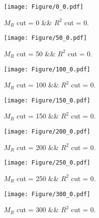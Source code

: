 \begin{figure}[H] 
\begin{center} 
\texttt{[image: Figure/0\_0.pdf]} 
\caption{$M_R$ cut = 0 \&\& $R^2$ cut = 0.} 
\label{Fig:0_0} 
\end{center} 
\end{figure} 
 
 
\begin{figure}[H] 
\begin{center} 
\texttt{[image: Figure/50\_0.pdf]} 
\caption{$M_R$ cut = 50 \&\& $R^2$ cut = 0.} 
\label{Fig:50_0} 
\end{center} 
\end{figure} 
 
 
\begin{figure}[H] 
\begin{center} 
\texttt{[image: Figure/100\_0.pdf]} 
\caption{$M_R$ cut = 100 \&\& $R^2$ cut = 0.} 
\label{Fig:100_0} 
\end{center} 
\end{figure} 
 
 
\begin{figure}[H] 
\begin{center} 
\texttt{[image: Figure/150\_0.pdf]} 
\caption{$M_R$ cut = 150 \&\& $R^2$ cut = 0.} 
\label{Fig:150_0} 
\end{center} 
\end{figure} 
 
 
\begin{figure}[H] 
\begin{center} 
\texttt{[image: Figure/200\_0.pdf]} 
\caption{$M_R$ cut = 200 \&\& $R^2$ cut = 0.} 
\label{Fig:200_0} 
\end{center} 
\end{figure} 
 
 
\begin{figure}[H] 
\begin{center} 
\texttt{[image: Figure/250\_0.pdf]} 
\caption{$M_R$ cut = 250 \&\& $R^2$ cut = 0.} 
\label{Fig:250_0} 
\end{center} 
\end{figure} 
 
 
\begin{figure}[H] 
\begin{center} 
\texttt{[image: Figure/300\_0.pdf]} 
\caption{$M_R$ cut = 300 \&\& $R^2$ cut = 0.} 
\label{Fig:300_0} 
\end{center} 
\end{figure} 
 
